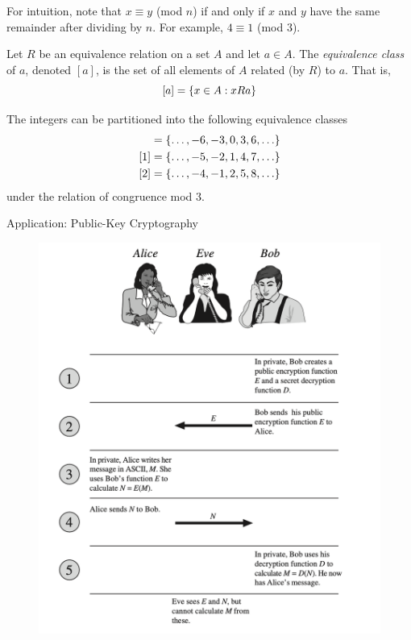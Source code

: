 \documentclass[10pt]{beamer}
\begin{document}
\begin{frame}
\small 
 \begin{myredbox}[title=Remark (which may help with intuition)]  
For intuition, note that $x \equiv y$ (mod $n$) if and only if $x$ and $y$ have the same remainder after dividing by $n$.  For example, $4 \equiv 1$ (mod 3).	 
\end{myredbox}
\vfill 
\begin{mygreenbox}[title=Definition]
Let $R$ be an equivalence relation on a set $A$ and let $a \in A$.   The \textit{equivalence class} of $a$, denoted $[a]$, is the set of all elements of $A$ related (by $R$) to $a$.  That is,
\[  [a] = \{ {x \in A: xRa} \}\]
\end{mygreenbox}
\vfill 
\begin{myyellowbox}[title=Example]
The integers can be partitioned into the following equivalence classes
%
\begin{align*}
[0] &= \set{\hdots, -6, -3, 0, 3, 6, \hdots} \\	
[1] &= \set{\hdots, -5, -2, 1, 4, 7, \hdots} \\	
[2] &= \set{\hdots, -4, -1, 2, 5, 8, \hdots} \\	
\end{align*}
%
under the relation of congruence mod 3.
\end{myyellowbox}

\end{frame}


\begin{frame}{Application: Public-Key Cryptography}
\footnotesize 
\begin{figure}[ht]
        \centering
        \includegraphics[width=.65\textwidth]{images/cryptography}
\end{figure}
\vfill 
\end{frame}
\end{document}
